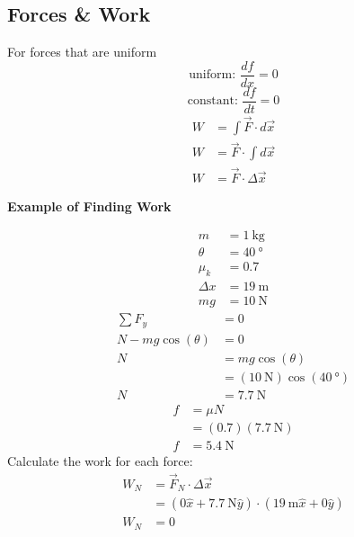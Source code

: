 \documentclass{article}
\begin{document}
\subsection{Forces \& Work}

For forces that are uniform
$$ \text{uniform: } \frac{df}{dx} = 0 $$
$$ \text{constant: } \frac{df}{dt} = 0 $$
\begin{align*}
	W & = \int \vec{F} \cdot d\vec{x} \\
	W & = \vec{F} \cdot \int d\vec{x} \\
	W & = \vec{F} \cdot \Delta \vec{x}
\end{align*}

\hr

\textbf{Example of Finding Work}

\begin{align*}
	m & = \SI{1}{\kilogram} \\
	\theta & = \SI{40}{\degree} \\
	\mu_k & = 0.7 \\
	\Delta x & = \SI{19}{\meter} \\
	mg & = \SI{10}{\newton}
\end{align*}
\begin{align*}
	\sum F_y & = 0 \\
	N - mg\cos(\theta) & = 0 \\
	N & = mg\cos(\theta) \\
	  & = (\SI{10}{\newton})\cos(\SI{40}{\degree}) \\
	N & = \SI{7.7}{\newton}
\end{align*}
\begin{align*}
	f & = \mu N \\
	  & = (0.7)(\SI{7.7}{\newton}) \\
	f & = \SI{5.4}{\newton}
\end{align*}
Calculate the work for each force:
\begin{align*}
	W_N & = \vec{F}_N \cdot \Delta \vec{x} \\
		& = (0 \hat{x} + \SI{7.7}{\newton} \hat{y}) \cdot (\SI{19}{\meter} \hat{x} + 0 \hat{y}) \\
	W_N & = 0
\end{align*}
\end{document}
